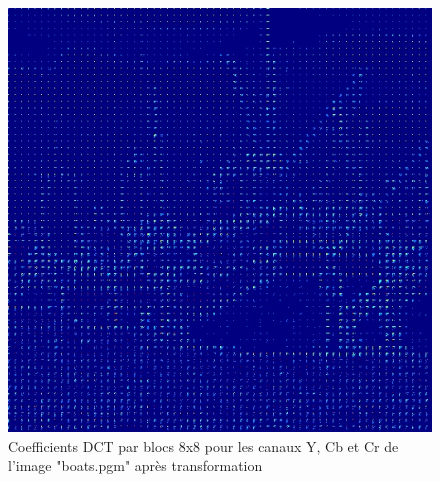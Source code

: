 \documentclass[12pt]{report}
\begin{document}
\begin{figure}[H]
\begin{center}
\includegraphics[scale=0.25]{../ImageRes/blockdct_transform_2.jpg} 
\caption{Coefficients DCT par blocs 8x8 pour les canaux Y, Cb et Cr de l'image "boats.pgm" après transformation}
\end{center}
\end{figure}
\end{document}
